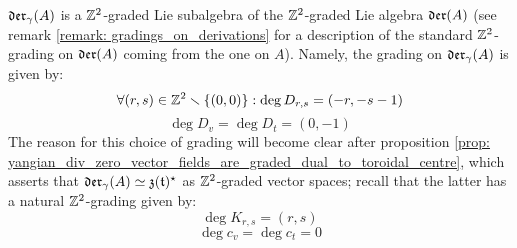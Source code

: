         \begin{corollary} \label{coro: yangian_div_zero_vector_fields_are_graded}
            $\mathfrak{der}_{\gamma}(A)$ is a $\mathbb{Z}^2$-graded Lie subalgebra of the $\mathbb{Z}^2$-graded Lie algebra $\mathfrak{der}(A)$ (see remark \ref{remark: gradings_on_derivations} for a description of the standard $\mathbb{Z}^2$-grading on $\mathfrak{der}(A)$ coming from the one on $A$). Namely, the grading on $\mathfrak{der}_{\gamma}(A)$ is given by:
                $$\forall (r, s) \in \mathbb{Z}^2 \smallsetminus \{(0, 0)\}: \deg D_{r, s} = (-r, -s - 1)$$
                $$\deg D_v = \deg D_t = (0, -1)$$
            The reason for this choice of grading will become clear after proposition \ref{prop: yangian_div_zero_vector_fields_are_graded_dual_to_toroidal_centre}, which asserts that $\mathfrak{der}_{\gamma}(A) \simeq \mathfrak{z}(\mathfrak{t})^{\star}$ as $\mathbb{Z}^2$-graded vector spaces; recall that the latter has a natural $\mathbb{Z}^2$-grading given by:
                $$\deg K_{r, s} = (r, s)$$
                $$\deg c_v = \deg c_t = 0$$
        \end{corollary}

